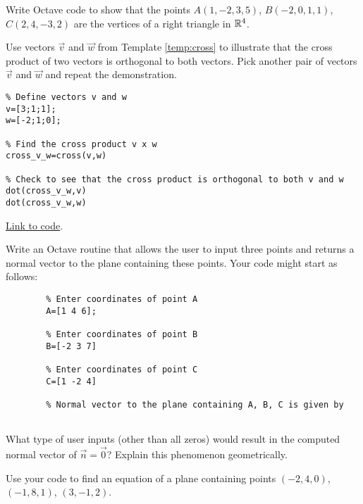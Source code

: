 \documentclass{ximera}
\begin{document}
\begin{problem}\label{prob_oct_vec_3}
Write Octave code to show that the points $A(1, -2, 3, 5)$, $B(-2, 0, 1, 1)$, $C(2, 4, -3, 2)$ are the vertices of a right triangle in $\mathbb{R}^4$.
\end{problem}

\begin{problem}\label{prob_oct_vec_1}
    Use vectors $\vec{v}$ and $\vec{w}$ from Template \ref{temp:cross} to illustrate that the cross product of two vectors is orthogonal to both vectors.  Pick another pair of vectors $\vec{v}$ and $\vec{w}$ and repeat the demonstration.
    \begin{hint}
        \begin{verbatim}
% Define vectors v and w
v=[3;1;1];
w=[-2;1;0];

% Find the cross product v x w
cross_v_w=cross(v,w)

% Check to see that the cross product is orthogonal to both v and w
dot(cross_v_w,v)
dot(cross_v_w,w)
\end{verbatim}

\href{https://sagecell.sagemath.org/?z=eJxtjsEKwjAQRO-B_sNeCg1UsHoMOSn-RJES09UEpSvJmvj5phUUxNvMMG9na9jj2U8ICS1TiJDATCPkSiTdb1WnuqOqRNb9alPMejaVqOHgS4kdgg0UI9wDjQ_LBX7O6BIOach6UU1qs3xzO4f2CkwQEQtv-M8RH4ECO7rQZG5z90Tsvn-NxM1noE3yN8nyBT-BRHk=&lang=octave&interacts=eJyLjgUAARUAuQ==}{Link to code}.
    \end{hint}
\end{problem}

\begin{problem}\label{prob_oct_vec_4}
    Write an Octave routine that allows the user to input three points and returns a normal vector to the plane containing these points.  Your code might start as follows:

    \begin{verbatim}
        % Enter coordinates of point A
        A=[1 4 6];
        
        % Enter coordinates of point B
        B=[-2 3 7]
        
        % Enter coordinates of point C
        C=[1 -2 4]
        
        % Normal vector to the plane containing A, B, C is given by
        
    \end{verbatim}

    What type of user inputs (other than all zeros) would result in the computed normal vector of $\vec{n}=\vec{0}$?  Explain this phenomenon geometrically.

    Use your code to find an equation of a plane containing points $(-2, 4, 0)$, $(-1, 8, 1)$, $(3, -1, 2)$.
\end{problem}    
\end{document}
